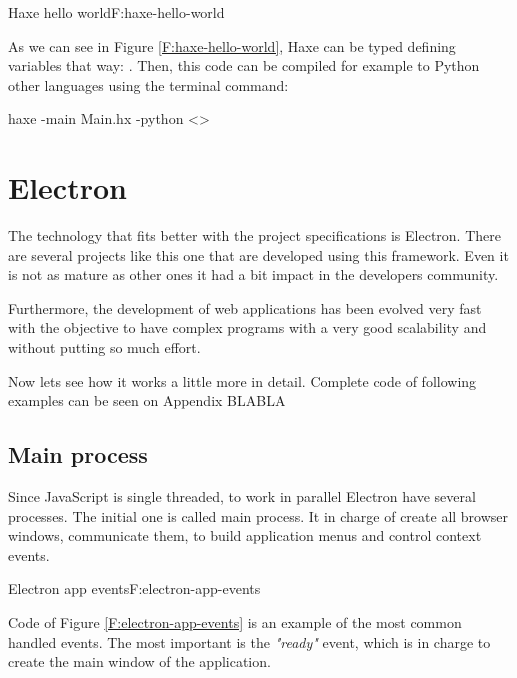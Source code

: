 \begin{codefigure}{Haxe hello world}{F:haxe-hello-world}
\end{codefigure}

As we can see in Figure \ref{F:haxe-hello-world}, Haxe can be typed defining 
variables that way: . Then, this code can be
compiled for example to Python other languages using the terminal command:

\begin{bashcode}
	haxe -main Main.hx -python \textless{}\textgreater
\end{bashcode}

\section{Electron}

The technology that fits better with the project specifications is Electron. 
There are several projects like this one that are developed using this 
framework. Even it is not as mature as other ones it had a bit impact in the
developers community.


Furthermore, the development of web applications has been evolved very fast with
the objective to have complex programs with a very good scalability and without
putting so much effort.

Now lets see how it works a little more in detail. Complete code of following 
examples can be seen on Appendix BLABLA


\subsection{Main process}

Since JavaScript is single threaded, to work in parallel Electron have several
processes. The initial one is called main process. It in charge of create all
browser windows, communicate them, to build application menus and control
context events.

\begin{codefigure}{Electron app events}{F:electron-app-events}
\end{codefigure}

Code of Figure \ref{F:electron-app-events} is an example of the most common
handled events. The most important is the \textit{"ready"} event, which is in
charge to create the main window of the application.

